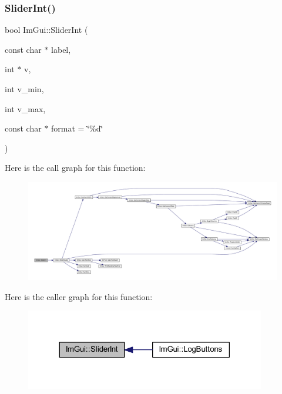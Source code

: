 \subsubsection{\texorpdfstring{Slider\+Int()}{SliderInt()}}
{\footnotesize\ttfamily bool Im\+Gui\+::\+Slider\+Int (\begin{DoxyParamCaption}\item[{const char $\ast$}]{label,  }\item[{int $\ast$}]{v,  }\item[{int}]{v\+\_\+min,  }\item[{int}]{v\+\_\+max,  }\item[{const char $\ast$}]{format = {\ttfamily \char`\"{}\%d\char`\"{}} }\end{DoxyParamCaption})}

Here is the call graph for this function\+:
\nopagebreak
\begin{figure}[H]
\begin{center}
\leavevmode
\includegraphics[width=350pt]{namespace_im_gui_a2a78a45bfc70a98c7894bc8e75c53e4b_cgraph}
\end{center}
\end{figure}
Here is the caller graph for this function\+:
\nopagebreak
\begin{figure}[H]
\begin{center}
\leavevmode
\includegraphics[width=297pt]{namespace_im_gui_a2a78a45bfc70a98c7894bc8e75c53e4b_icgraph}
\end{center}
\end{figure}
\mbox{\label{namespace_im_gui_a4d65e19b43b2f70d22e47cac3130cddd}} 
